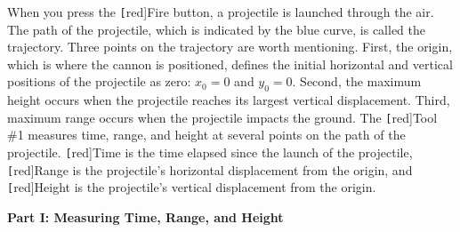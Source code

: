 \documentclass[main-physics.tex]{subfiles}
\begin{document}
When you press the \texttt[red]{Fire} button, a projectile is launched through the air. The path of the projectile, which is indicated by the blue curve, is called the trajectory. Three points on the trajectory are worth mentioning. First, the origin, which is where the cannon is positioned, defines the initial horizontal and vertical positions of the projectile as zero: $x_0=0$ and $y_0 = 0$. Second, the maximum height occurs when the projectile reaches its largest vertical displacement. Third, maximum range occurs when the projectile impacts the ground. The \texttt[red]{Tool \#1} measures time, range, and height at several points on the path of the projectile. \texttt[red]{Time} is the time elapsed since the launch of the projectile, \texttt[red]{Range} is the projectile's horizontal displacement from the origin, and \texttt[red]{Height} is the projectile's vertical displacement from the origin. 

\begin{center}
\end{center}

\vspace{1em}

\textbf{Part I: Measuring Time, Range, and Height}
\end{document}
